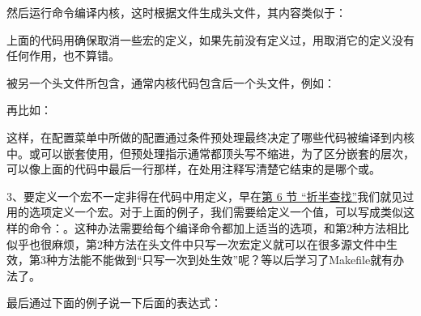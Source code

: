 

然后运行命令编译内核，这时根据文件生成头文件，其内容类似于：




上面的代码用确保取消一些宏的定义，如果先前没有定义过，用取消它的定义没有任何作用，也不算错。



被另一个头文件所包含，通常内核代码包含后一个头文件，例如：




再比如：




这样，在配置菜单中所做的配置通过条件预处理最终决定了哪些代码被编译到内核中。或可以嵌套使用，但预处理指示通常都顶头写不缩进，为了区分嵌套的层次，可以像上面的代码中最后一行那样，在处用注释写清楚它结束的是哪个或。



3、要定义一个宏不一定非得在代码中用定义，早在\hyperlink{db.ch11s06.id2746698}{第 6 节 “折半查找”}我们就见过用的选项定义一个宏。对于上面的例子，我们需要给定义一个值，可以写成类似这样的命令：。这种办法需要给每个编译命令都加上适当的选项，和第2种方法相比似乎也很麻烦，第2种方法在头文件中只写一次宏定义就可以在很多源文件中生效，第3种方法能不能做到“只写一次到处生效”呢？等以后学习了Makefile就有办法了。



最后通过下面的例子说一下后面的表达式：



